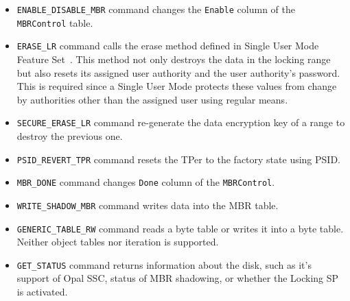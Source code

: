 \begin{itemize}
\item \verb|ENABLE_DISABLE_MBR| command changes the \verb|Enable| column of the \verb|MBRControl| table. %
\item \verb|ERASE_LR| command calls the erase method defined in Single User Mode Feature Set~\cite{tcg-sum}. 
This method not only destroys the data in the locking range but also resets its assigned user authority and the user authority's password. 
This is required since a Single User Mode protects these values from change by authorities other than the assigned user using regular means.
\item \verb|SECURE_ERASE_LR| command re-generate the data encryption key of a range to destroy the previous one.
\item \verb|PSID_REVERT_TPR| command resets the TPer to the factory state using PSID.
\item \verb|MBR_DONE| command changes \verb|Done| column of the \verb|MBRControl|. %
\item \verb|WRITE_SHADOW_MBR| command writes data into the MBR table.
\item \verb|GENERIC_TABLE_RW| command reads a byte table or writes it into a byte table. Neither object tables nor iteration is supported.
\item \verb|GET_STATUS| command returns information about the disk, such as it's support of Opal SSC, status of MBR shadowing, or whether the Locking SP is activated.
\end{itemize}

